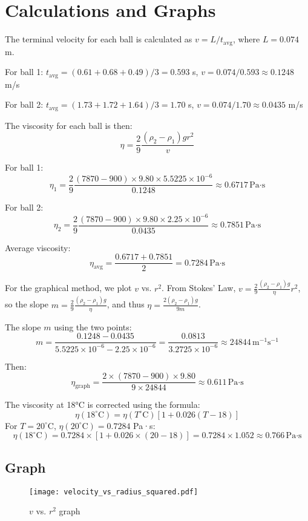 \documentclass[12pt, a4paper]{article}
\begin{document}
\section{Calculations and Graphs}
The terminal velocity for each ball is calculated as $v = L / t_{\text{avg}}$, where $L = 0.074$ m.

For ball 1: $t_{\text{avg}} = (0.61 + 0.68 + 0.49)/3 = 0.593$ s, $v = 0.074 / 0.593 \approx 0.1248$ m/s

For ball 2: $t_{\text{avg}} = (1.73 + 1.72 + 1.64)/3 = 1.70$ s, $v = 0.074 / 1.70 \approx 0.0435$ m/s

The viscosity for each ball is then:
\[ \eta = \frac{2}{9} \frac{(\rho_2 - \rho_1) g r^2}{v} \]

For ball 1:
\[ \eta_1 = \frac{2}{9} \frac{(7870 - 900) \times 9.80 \times 5.5225 \times 10^{-6}}{0.1248} \approx 0.6717 \, \text{Pa·s} \]

For ball 2:
\[ \eta_2 = \frac{2}{9} \frac{(7870 - 900) \times 9.80 \times 2.25 \times 10^{-6}}{0.0435} \approx 0.7851 \, \text{Pa·s} \]

Average viscosity:
\[ \eta_{\text{avg}} = \frac{0.6717 + 0.7851}{2} = 0.7284 \, \text{Pa·s} \]

For the graphical method, we plot $v$ vs. $r^2$. From Stokes' Law, $v = \frac{2}{9} \frac{(\rho_2 - \rho_1) g}{\eta} r^2$, so the slope $m = \frac{2}{9} \frac{(\rho_2 - \rho_1) g}{\eta}$, and thus $\eta = \frac{2 (\rho_2 - \rho_1) g}{9 m}$.

The slope $m$ using the two points:
\[ m = \frac{0.1248 - 0.0435}{5.5225 \times 10^{-6} - 2.25 \times 10^{-6}} = \frac{0.0813}{3.2725 \times 10^{-6}} \approx 24844 \, \text{m}^{-1} \text{s}^{-1} \]

Then:
\[ \eta_{\text{graph}} = \frac{2 \times (7870 - 900) \times 9.80}{9 \times 24844} \approx 0.611 \, \text{Pa·s} \]

The viscosity at 18°C is corrected using the formula:
\[ \eta(18^\circ \text{C}) = \eta(T^\circ \text{C}) \left[1 + 0.026 (T - 18)\right] \]
For $T = 20^\circ$C, $\eta(20^\circ \text{C}) = 0.7284$ Pa·s:
\[ \eta(18^\circ \text{C}) = 0.7284 \times [1 + 0.026 \times (20 - 18)] = 0.7284 \times 1.052 \approx 0.766 \, \text{Pa·s} \]

\subsection{Graph}
\begin{figure}[H]
	\centering
	\texttt{[image: velocity\_vs\_radius\_squared.pdf]}
	\caption{$v$ vs. $r^2$ graph}
\end{figure}
\end{document}
